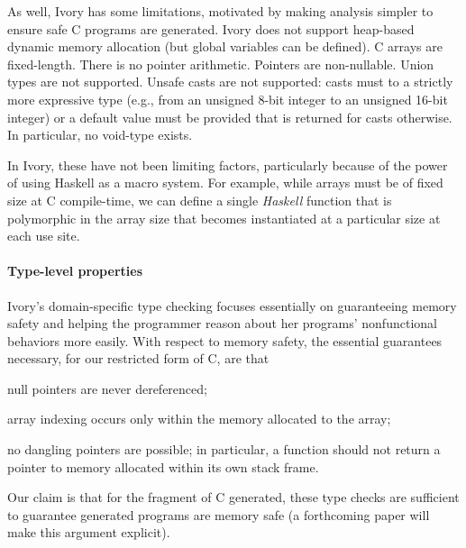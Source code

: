 As well, Ivory has some limitations, motivated by making analysis simpler to
ensure safe C programs are generated.  Ivory does not support heap-based dynamic
memory allocation (but global variables can be defined).  C arrays are
fixed-length.  There is no pointer arithmetic.  Pointers are non-nullable.
Union types are not supported.  Unsafe casts are not supported: casts must to a
strictly more expressive type (e.g., from an unsigned 8-bit integer to an
unsigned 16-bit integer) or a default value must be provided that is returned
for casts otherwise.  In particular, no void-type exists.

In Ivory, these have not been limiting factors, particularly because of the
power of using Haskell as a macro system.  For example, while arrays must be of
fixed size at C compile-time, we can define a single \emph{Haskell} function
that is polymorphic in the array size that becomes instantiated at a particular
size at each use site.  %


\paragraph{Type-level properties}
Ivory's domain-specific type checking focuses essentially on guaranteeing memory
safety and helping the programmer reason about her programs' nonfunctional
behaviors more easily.  With respect to memory safety, the essential
guarantees necessary, for our restricted form of C, are that
\begin{compactitem}
  \item null pointers are never dereferenced;
  \item array indexing occurs only within the memory allocated to
    the array;
  \item no dangling pointers are possible; in particular, a function should not
    return a pointer to memory allocated within its own stack frame.
\end{compactitem}

\noindent
Our claim is that for the fragment of C generated, these type checks are
sufficient to guarantee generated programs are memory safe (a forthcoming paper
will make this argument explicit).

